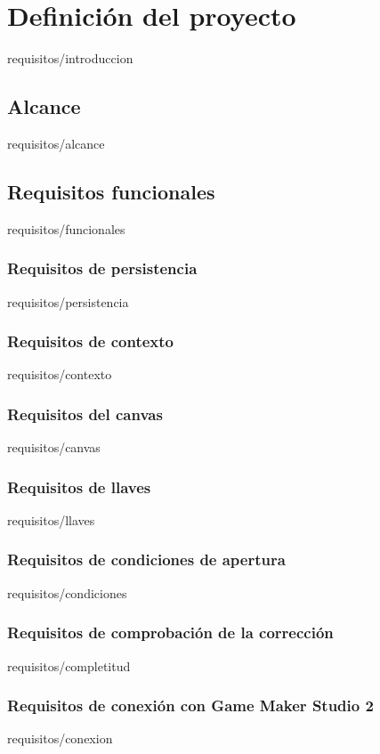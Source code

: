 \documentclass[epsbased,lof,loc,copyright,final,extendedindex,firstnumbered,tfg,gnuplot]{tfgtfmthesisuam}
\begin{document}
\chapter{Definición del proyecto\label{CAP:REQUISITOS}}{requisitos/introduccion}
	\section{Alcance\label{SEC:ALCANCE}}{requisitos/alcance}
	\section{Requisitos funcionales\label{SEC:REQUISITOSFUNCIONALES}}{requisitos/funcionales}
		\begin{functional}
		\subsection{Requisitos de persistencia\label{SUBSEC:REQPERSISTENCIA}}{requisitos/persistencia}
		\subsection{Requisitos de contexto\label{SUBSEC:REQCONTEXTO}}{requisitos/contexto}
		\subsection{Requisitos del canvas\label{SUBSEC:REQCANVAS}}{requisitos/canvas}
		\subsection{Requisitos de llaves\label{SUBSEC:REQLLAVES}}{requisitos/llaves}
		\subsection{Requisitos de condiciones de apertura\label{SUBSEC:REQCONDICIONES}}{requisitos/condiciones}
		\subsection{Requisitos de comprobación de la corrección\label{SUBSEC:REQCOMPLETITUD}}{requisitos/completitud}
		\subsection{Requisitos de conexión con Game Maker Studio 2\label{SUBSEC:REQCONEXION}}{requisitos/conexion}
		\end{functional}
\end{document}
